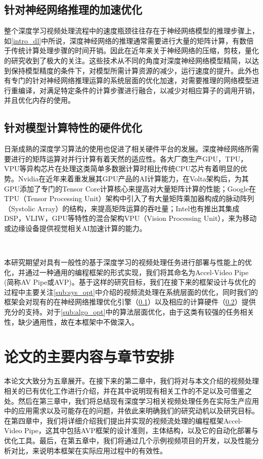 \subsection{针对神经网络推理的加速优化}\label{sub:infer_opt}
整个深度学习视频处理流程中的速度瓶颈往往存在于神经网络模型的推理步骤上，如\ref{intro_dl}中所说，深度神经网络的推理通常需要进行大量的矩阵计算，有数倍于传统计算处理步骤的时间开销。因此在近年来关于神经网络的压缩，剪枝，量化的研究收到了极大的关注。这些技术从不同的角度对深度神经网络模型精简，以达到保持模型精度的条件下，对模型所需计算资源的减少，运行速度的提升。此外也有专门的针对神经网络推理运算的系统层面的优化加速，对需要推理的网络模型进行重编译，对满足特定条件的计算步骤进行融合，以减少对相应算子的调用开销，并且优化内存的使用。

\subsection{针对模型计算特性的硬件优化}\label{sub:HW_opt}
日渐成熟的深度学习算法的使用也促进了相关硬件平台的发展。深度神经网络所需要进行的矩阵运算对并行计算有着天然的适应性。各大厂商生产GPU，TPU，VPU等异构芯片在处理这类简单多数据计算时相比传统CPU芯片有着明显的优势。Nvidia在近年来着重发展其GPU产品的AI计算能力，在Volta架构后，为其GPU添加了专门的Tensor Core计算核心来提高对大量矩阵计算的性能；Google在TPU\cite{jouppi2017datacenter}（Tensor Processing Unit）架构中引入了有大量矩阵乘加器构成的脉动阵列（Systolic Array）的结构，来提高矩阵运算的吞吐量；Intel也有推出其集成DSP，VLIW，GPU等特性的混合架构VPU\cite{moloney2014myriad}（Vision Processing Unit），来为移动或边缘设备提供视觉相关AI加速计算的能力。\par~\par

本研究期望对具有一般性的基于深度学习的视频处理任务进行部署与性能上的优化，并通过一种通用的编程框架的形式实现，我们将其命名为Accel-Video Pipe (简称AV Pipe或AVP)。基于这样的研究目标，我们在接下来的框架设计与优化的过程中主要关注\ref{sub:sys_opt}中介绍的视频流处理在系统层面的优化，同时我们的框架会对现有的在神经网络推理优化引擎（\ref{sub:infer_opt}）以及相应的计算硬件（\ref{sub:HW_opt}）提供充分的支持。对于\ref{sub:algo_opt}中的算法层面优化，由于这类有较强的任务相关性，缺少通用性，故在本框架中不做深入。

\section{论文的主要内容与章节安排}
本论文大致分为五章展开。在接下来的第二章中，我们将对与本文介绍的视频处理相关的已有优化工作进行介绍，并在其中说明现有相关工作的不足以及可借鉴之处。然后在第三章中，我们将总结现有深度学习相关视频处理任务在实际生产应用中的应用需求以及可能存在的问题，并依此来明确我们的研究动机以及研究目标。
在第四章中，我们将详细介绍我们提出并实现的视频流处理的编程框架Accel-Video Pipe，这其中包括AVP框架的设计准则，主体结构，以及它的自动化部署与优化工具。最后，在第五章中，我们将通过几个示例视频项目的开发，以及性能分析对比，来说明本框架在实际应用过程中的有效性。
